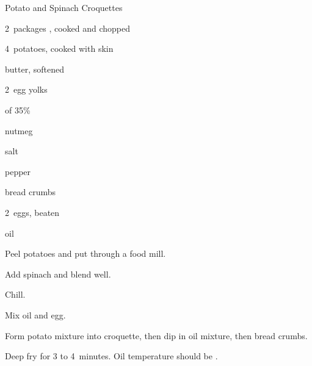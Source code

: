 \begin{recipe}{Potato and Spinach Croquettes}{}{}

\begin{ingredients}
\item 2~packages , cooked and chopped
\item 4~potatoes, cooked with skin
\item {} butter, softened
\item 2~egg yolks
\item {} of 35\% 
\item \tp{\half} nutmeg
\item salt
\item pepper
\item {} bread crumbs
\item 2~eggs, beaten
\item {} oil
\end{ingredients}

\begin{directions}
\item Peel potatoes and put through a food mill.
\item Add spinach and blend well.
\item Chill.
\item Mix oil and egg.
\item Form potato mixture into croquette, then dip in oil mixture, then bread crumbs.
\item Deep fry for 3 to 4~minutes. Oil temperature should be .
\end{directions}

\end{recipe}
